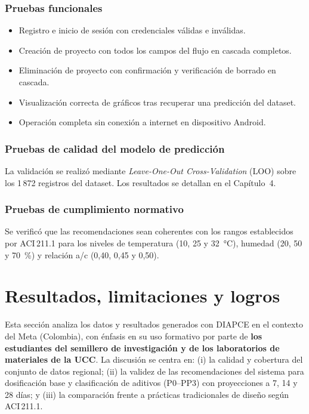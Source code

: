 \documentclass[12pt, letterpaper]{article}
\begin{document}
\subsubsection*{Pruebas funcionales}
\begin{itemize}
    \item Registro e inicio de sesión con credenciales válidas e inválidas.
    \item Creación de proyecto con todos los campos del flujo en cascada completos.
    \item Eliminación de proyecto con confirmación y verificación de borrado en cascada.
    \item Visualización correcta de gráficos tras recuperar una predicción del dataset.
    \item Operación completa sin conexión a internet en dispositivo Android.
\end{itemize}

\subsubsection*{Pruebas de calidad del modelo de predicción}

La validación se realizó mediante \textit{Leave-One-Out Cross-Validation} (LOO) sobre los 1\,872 registros del dataset. Los resultados se detallan en el Capítulo~4.

\subsubsection*{Pruebas de cumplimiento normativo}

Se verificó que las recomendaciones sean coherentes con los rangos establecidos por ACI\,211.1 para los niveles de temperatura (10, 25 y 32~°C), humedad (20, 50 y 70~\%) y relación a/c (0{,}40, 0{,}45 y 0{,}50).

\newpage
\section{Resultados, limitaciones y logros}

Esta sección analiza los datos y resultados generados con DIAPCE en el contexto del Meta (Colombia), con énfasis en su uso formativo por parte de \textbf{los estudiantes del semillero de investigación y de los laboratorios de materiales de la UCC}. La discusión se centra en: (i) la calidad y cobertura del conjunto de datos regional; (ii) la validez de las recomendaciones del sistema para dosificación base y clasificación de aditivos (P0--PP3) con proyecciones a 7, 14 y 28 días; y (iii) la comparación frente a prácticas tradicionales de diseño según ACI\,211.1.
\end{document}
